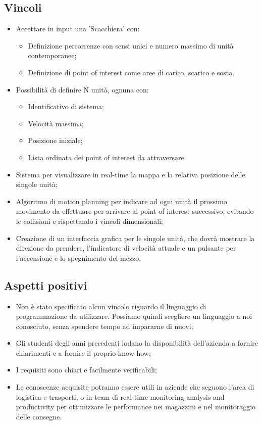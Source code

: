 \subsection{Vincoli}
\begin{itemize}
\item Accettare in input una 'Scacchiera' con:
\begin{itemize}
	\item Definizione percorrenze con sensi unici e numero massimo di unità contemporanee;
	\item Definizione di point of interest come aree di carico, scarico e sosta.
\end{itemize}
\item Possibilità di definire N unità, ognuna con:
\begin{itemize}
	\item Identificativo di sistema;
	\item Velocità massima;
	\item Posizione iniziale;
	\item Lista ordinata dei point of interest da attraversare.
\end{itemize}
\item Sistema per visualizzare in real-time la mappa e la relativa posizione delle singole unità;
\item Algoritmo di motion planning per indicare ad ogni unità il prossimo movimento da effettuare per arrivare al point of interest successivo, evitando le collisioni e rispettando i vincoli dimensionali;
\item Creazione di un interfaccia grafica per le singole unità, che dovrà mostrare la direzione da prendere, l'indicatore di velocità attuale e un pulsante per l'accensione e lo spegnimento del mezzo.
\end{itemize}

\subsection{Aspetti positivi}
\begin{itemize}
\item Non è stato specificato alcun vincolo riguardo il linguaggio di programmazione da utilizzare. Possiamo quindi scegliere un linguaggio a noi conosciuto, senza spendere tempo ad impararne di nuovi;
\item Gli studenti degli anni precedenti lodano la disponibilità dell'azienda a fornire chiarimenti e a fornire il proprio know-how;
\item I requisiti sono chiari e facilmente verificabili;
\item Le conoscenze acquisite potranno essere utili in aziende che seguono l'area di logistica e trasporti, o in team di real-time monitoring analysis and productivity per ottimizzare le performance nei magazzini e nel monitoraggio delle consegne.
\end{itemize}

